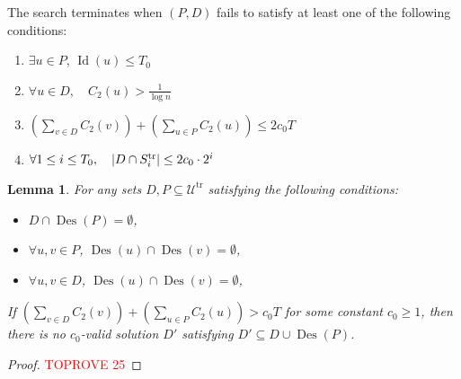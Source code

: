 \documentclass[11pt,a4paper]{article} \usepackage{enumitem}
\newcommand{\calU}{\mathcal{U}}
\newcommand{\trU}{\operatorname{\calU^{tr}}}
\newcommand{\trS}[1]{\ifx\relax#1\relax
    S^{\operatorname{tr}} \else
    S^{\operatorname{tr}}_{#1} \fi
}
\newcommand{\Des}{\operatorname{Des}}
\newcommand{\Lev}{\operatorname{Id}}
\newtheorem{lemma}[theorem]{Lemma}
\theoremstyle{definition}
\begin{document}
The search terminates when \( (P, D) \) fails to satisfy at least one of the following conditions:
\begin{enumerate}
\item $\exists u\in P$, $\Lev(u)\le T_0$
\item \( \forall u\in D, \quad C_2(u) > \frac{1}{\log n} \)
\item \( \left(\sum_{v \in D} C_2(v)\right) + \left(\sum_{u \in P} C_2(u)\right) \le 2c_0 T \)
\item \( \forall 1\le i \leq T_0, \quad |D \cap \trS{i}| \le 2c_0 \cdot 2^i \)
\end{enumerate}


\begin{lemma}\label{lem:tree-6}
For any sets $D, P \subseteq \trU$ satisfying the following conditions:

\begin{itemize}
\item $D \cap \Des(P) = \emptyset$,

\item $\forall u, v \in P$, $\Des(u) \cap \Des(v) = \emptyset$,

\item $\forall u, v \in D$, $\Des(u) \cap \Des(v) = \emptyset$,

\end{itemize}
If $\left(\sum_{v \in D} C_2(v)\right) + \left(\sum_{u \in P} C_2(u)\right) > c_0 T$ for some constant $c_0 \geq 1$, then there is no $c_0$-valid solution $D'$ satisfying $D' \subseteq D \cup \Des(P)$.
\end{lemma}

\begin{proof}\textcolor{red}{TOPROVE 25}\end{proof}
\end{document}
